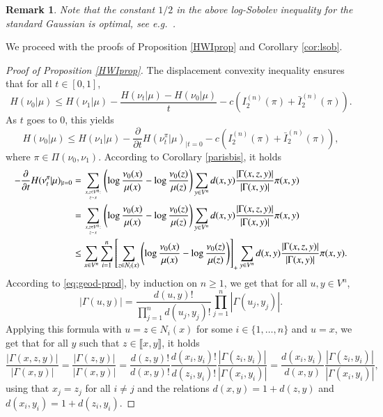\documentclass[11pt]{amsart}
\newtheorem{rem}[equation]{Remark}
\numberwithin{equation}{section}
\begin{document}
\begin{rem}
Note that the constant $1/2$ in the above log-Sobolev inequality for the standard Gaussian is optimal, see \textit{e.g.}\ \cite[Chapter 1]{ane}.
\end{rem}

We proceed with the proofs of Proposition \ref{HWIprop} and Corollary \ref{cor:lsob}.

\begin{proof}[Proof of Proposition \ref{HWIprop}] The displacement convexity inequality ensures that for all $t \in [0,1]$, 
$$H(\nu_0|\mu)\leq H(\nu_1|\mu)- \frac{H(\nu_t  | \mu) - H(\nu_0|\mu)}{t} -c (I_2^{(n)} (\pi)+\bar{I}_2^{(n)}(\pi)).$$
As $t$ goes to 0, this yields
$$H(\nu_0|\mu)\leq H(\nu_1|\mu) - \frac{\partial}{\partial t}H(\nu_t^\pi|\mu)_{|t=0}- c(I_2^{(n)} (\pi)+\bar{I}_2^{(n)}(\pi)),$$
where $\pi \in\Pi(\nu_0,\nu_1)$.
According to Corollary \ref{parisbis}, it holds
\begin{align*}
- \frac{\partial}{\partial t}  H(\nu_t^\pi|\mu)_{|t=0} & =\sum_{\genfrac{}{}{0pt}{}{x,z \in V^n:}{z \sim x}} \left( \log  \frac{\nu_0(x)}{\mu(x)} - \log \frac{\nu_0(z)}{\mu(z)}  \right)
\sum_{y \in V^n} d(x,y)\frac{|\Gamma(x,z,y)|}{|\Gamma(x,y)|} \pi(x,y)\\
&= \sum_{\genfrac{}{}{0pt}{}{x,z \in V^n:}{z \sim x}} \left( \log  \frac{\nu_0(x)}{\mu(x)} - \log \frac{\nu_0(z)}{\mu(z)}  \right)
\sum_{y \in V^n} d(x,y)\frac{|\Gamma(x,z,y)|}{|\Gamma(x,y)|} \pi(x,y)\\
&\leq \sum_{x\in V^n} \sum_{i=1}^n \left[\sum_{z\in N_i(x)} \left( \log  \frac{\nu_0(x)}{\mu(x)} - \log \frac{\nu_0(z)}{\mu(z)} \right) \right]_{+}
\sum_{y \in V^n} d(x,y)\frac{|\Gamma(x,z,y)|}{|\Gamma(x,y)|} \pi(x,y) .
\end{align*}
According to \eqref{eq:geod-prod}, by induction on $n\ge 1$, we get  that for all $u,y\in V^n$, 
$$|\Gamma(u,y)|=\frac{d(u,y)!}{\prod_{j=1}^n d(u_j,y_j)!} \prod_{j=1}^n |\Gamma(u_j,y_j)|.$$
Applying this formula with $u=z\in N_i(x)$ for some $i\in \{1,\ldots,n\}$ and $u=x$, we get that for all $y$ such that $z\in \llbracket x,y\rrbracket$, it holds
\begin{equation}\label{changement}
\frac{|\Gamma(x,z,y)|}{|\Gamma(x,y)|}=\frac{|\Gamma(z,y)|}{|\Gamma(x,y)|}=\frac{d(z,y)!}{d(x,y)!} \frac{d(x_i,y_i)!}{d(z_i,y_i)!}\frac{|\Gamma(z_i,y_i)|}{|\Gamma(x_i,y_i)|}=\frac{d(x_i,y_i)}{d(x,y)}\frac{|\Gamma(z_i,y_i)|}{|\Gamma(x_i,y_i)|},
\end{equation}
using that $x_j=z_j$ for all $i\neq j$ and the relations $d(x,y)=1+d(z,y)$ and $d(x_i,y_i)=1+d(z_i,y_i).$

\end{proof}
\end{document}
